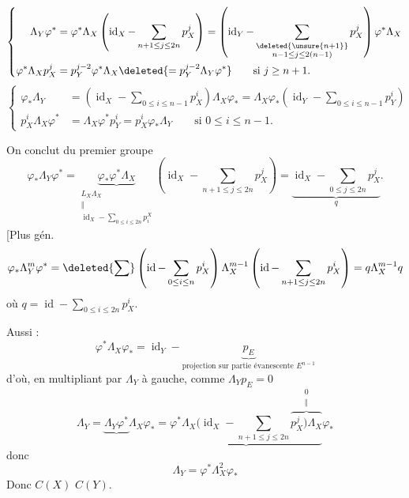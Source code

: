 \[
\left\{\begin{aligned}
\Lambda_Y\varphi^*&=\varphi^*\Lambda_X\left(\operatorname{id}_X-\sum_{n+1\leq j\leq2n}p_X^j\right)
=\left(\operatorname{id}_Y-\sum_{\substack{\deleted{\unsure{n+1}}\\n-1\leq j\leq2(n-1)}}p_X^j\right)\varphi^*\Lambda_X\\
\varphi^*\Lambda_Xp_X^j&=p_Y^{j-2}\varphi^*\Lambda_X\deleted{=p_Y^{j-2}\Lambda_Y\varphi^*}
\qquad\text{si }j\geq n+1.
\end{aligned}\right.
\]
\[
\left\{\begin{aligned}
\varphi_*\Lambda_Y&=\left(\operatorname{id}_X-\sum_{0\leq i\leq n-1}p_X^i\right)\Lambda_X\varphi_*
=\Lambda_X\varphi_*\left(\operatorname{id}_Y-\sum_{0\leq i\leq n-1}p_Y^i\right)\\
p_X^i\Lambda_X\varphi^*&=\Lambda_X\varphi^*p_Y^i=p_X^i\varphi_*\Lambda_Y\qquad\text{si }0\leq i\leq n-1.
\end{aligned}\right.
\]

On conclut du premier groupe
\[
\varphi_*\Lambda_Y\varphi^*
=\underbrace{\varphi_*\varphi^*\Lambda_X}_{\substack{L_X\Lambda_X\\\Vert\\\operatorname{id}_X-\sum_{0\leq i\leq2n}p_i^X}}
\left(\operatorname{id}_X-\sum_{n+1\leq j\leq2n}p_X^j\right)
=\underbrace{\operatorname{id}_X-\sum_{0\leq j\leq2n}p_X^j}_{q}.
\]
[Plus gén.
\[
\varphi_*\Lambda_Y^m\varphi^*
=\deleted{\sum}\left(\operatorname{id}-\sum_{0\leq i\leq n}p_X^i\right)\Lambda_X^{m-1}
\left(\operatorname{id}-\sum_{n+1\leq j\leq2n}p_X^i\right)
=q\Lambda_X^{m-1}q
\]
où $q=\operatorname{id}-\displaystyle\sum_{0\leq i\leq2n}p_X^i$.

Aussi :
\[
\varphi^*\Lambda_X\varphi_*=\operatorname{id}_Y-\underbrace{p_E}_{\text{projection sur partie évanescente }E^{n-1}}
\]
d'où, en multipliant par $\Lambda_Y$ à gauche, comme $\Lambda_Yp_E=0$
\[
\Lambda_Y=\underbrace{\Lambda_Y\varphi^*}\Lambda_X\varphi_*
=\underbrace{\varphi^*\Lambda_X(\operatorname{id}_X-\sum_{n+1\leq j\leq2n}\overbrace{p_X^j)\Lambda_X}^{\substack{0\\\Vert}}}\varphi_*
\]
donc
\[\boxed{\Lambda_Y=\varphi^*\Lambda_X^2\varphi_*}\]
Donc $C(X)$  $C(Y)$.

